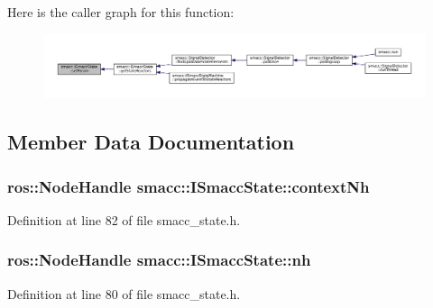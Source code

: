 Here is the caller graph for this function\+:
\nopagebreak
\begin{figure}[H]
\begin{center}
\leavevmode
\includegraphics[width=350pt]{classsmacc_1_1ISmaccState_a0b6c531ca8c446052022308548f55b92_icgraph}
\end{center}
\end{figure}




\subsection{Member Data Documentation}
\subsubsection[{\texorpdfstring{context\+Nh}{contextNh}}]{\setlength{\rightskip}{0pt plus 5cm}ros\+::\+Node\+Handle smacc\+::\+I\+Smacc\+State\+::context\+Nh\hspace{0.3cm}{\ttfamily [protected]}}\hypertarget{classsmacc_1_1ISmaccState_ae59191a663a08489b7d10036f3b25238}{}\label{classsmacc_1_1ISmaccState_ae59191a663a08489b7d10036f3b25238}


Definition at line 82 of file smacc\+\_\+state.\+h.

\subsubsection[{\texorpdfstring{nh}{nh}}]{\setlength{\rightskip}{0pt plus 5cm}ros\+::\+Node\+Handle smacc\+::\+I\+Smacc\+State\+::nh\hspace{0.3cm}{\ttfamily [protected]}}\hypertarget{classsmacc_1_1ISmaccState_a13fe6e6abfdb87996402189d44b78494}{}\label{classsmacc_1_1ISmaccState_a13fe6e6abfdb87996402189d44b78494}


Definition at line 80 of file smacc\+\_\+state.\+h.



